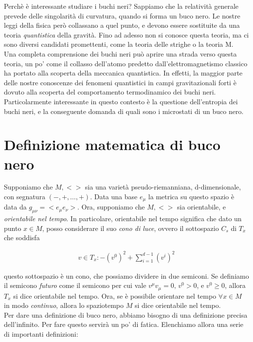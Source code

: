 \documentclass{report}
\begin{document}
Perchè è interessante studiare i buchi neri? Sappiamo che la relatività generale prevede delle singolarità di curvatura, quando si forma un buco nero. Le nostre leggi della fisica però collassano a quel punto, e devono essere sostituite da una teoria \emph{quantistica} della gravità. Fino ad adesso non si conosce questa teoria, ma ci sono diversi candidati promettenti, come la teoria delle strighe o la teoria M. \\

Una completa comprensione dei buchi neri può aprire una strada verso questa teoria, un po' come il collasso dell'atomo predetto dall'elettromagnetismo classico ha portato alla scoperta della meccanica quantistica. In effetti, la maggior parte delle nostre conoscenze dei fenomeni quantistici in campi gravitazionali forti è dovuto alla scoperta del comportamento termodinamico dei buchi neri. \\

Particolarmente interessante in questo contesto è la questione dell'entropia dei buchi neri, e la conseguente domanda di quali sono i microstati di un buco nero. 

\section{Definizione matematica di buco nero}

Supponiamo che \(M, <>\) sia una varietà pseudo-riemanniana, d-dimensionale, con segnatura \((-, +, \ldots, +)\). Data una base \(e_{\mu}\) la metrica su questo spazio è data da \(g_{\mu\nu} = <e_\mu e_\nu>\). Ora, supponiamo che \(M, <>\) sia orientabile, e \emph{orientabile nel tempo}. In particolare, orientabile nel tempo significa che dato un punto \(x \in M\), posso considerare il suo \emph{cono di luce}, ovvero il sottospazio \(C_s\) di \(T_x\) che soddisfa 

\begin{align}
    v \in T_x : -(v^0)^2 + \sum_{i=1}^{d-1}(v^i)^2
\end{align}

questo sottospazio è un cono, che possiamo dividere in due semiconi. Se definiamo il semicono \emph{futuro} come il semicono per cui vale \(v^\mu v_\mu = 0, \, v^0 > 0\), e \(v^0 \geq 0\), allora \(T_x\) si dice orientabile nel tempo. Ora, se è possibile orientare nel tempo \(\forall x \in M\) in modo \emph{continuo}, allora lo spaziotempo \(M\) si dice orientabile nel tempo. \\

Per dare una definizione di buco nero, abbiamo bisogno di una definizione precisa dell'infinito. Per fare questo servirà un po' di fatica. Elenchiamo allora una serie di importanti definizioni: 
\end{document}

